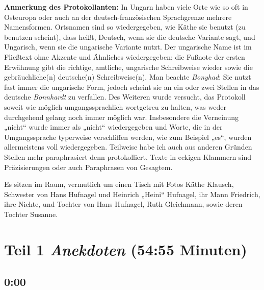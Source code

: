 \documentclass[ngerman,]{article}
\begin{document}
\begin{multicols}{3}
\textbf{Anmerkung des Protokollanten:} In Ungarn haben viele Orte wie so
oft in Osteuropa oder auch an der deutsch-französischen Sprachgrenze
mehrere Namensformen. Ortsnamen sind so wiedergegeben, wie Käthe sie
benutzt (zu benutzen scheint), dass heißt, Deutsch, wenn sie die
deutsche Variante sagt, und Ungarisch, wenn sie die ungarische Variante
nutzt. Der ungarische Name ist im Fließtext ohne Akzente und Ähnliches
wiedergegeben; die Fußnote der ersten Erwähnung gibt die richtige,
amtliche, ungarische Schreibweise wieder sowie die gebräuchliche(n)
deutsche(n) Schreibweise(n). Man beachte \emph{Bonyhad}: Sie nutzt fast
immer die ungarische Form, jedoch scheint sie an ein oder zwei Stellen
in das deutsche \emph{Bonnhardt} zu verfallen. Des Weiteren wurde
versucht, das Protokoll soweit wie möglich umgangssprachlich wortgetreu
zu halten, was weder durchgehend gelang noch immer möglich war.
Insbesondere die Verneinung „nicht“ wurde immer als „nicht“
wiedergegeben und Worte, die in der Umgangssprache typerweise
verschliffen werden, wie zum Beispiel „es“, wurden allermeistens voll
wiedergegeben. Teilweise habe ich auch aus anderen Gründen Stellen mehr
paraphrasiert denn protokolliert. Texte in eckigen Klammern sind
Präzisierungen oder auch Paraphrasen von Gesagtem.

Es sitzen im Raum, vermutlich um einen Tisch mit Fotos Käthe Klausch,
Schwester von Hans Hufnagel und Heinrich „Heini“ Hufnagel, ihr Mann
Friedrich, ihre Nichte, und Tochter von Hans Hufnagel, Ruth Gleichmann,
sowie deren Tochter Susanne.

\hypertarget{anekdoten}{%
\section{\texorpdfstring{Teil 1 \emph{Anekdoten} (54:55
Minuten)}{Teil 1 Anekdoten (54:55 Minuten)}}\label{anekdoten}}

\hypertarget{section}{%
\subsection{0:00}\label{section}}


\end{multicols}
\end{document}

